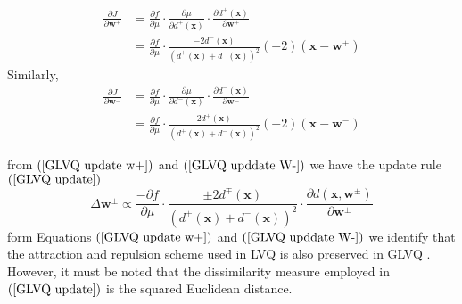 \documentclass[english]{HSMW-Thesis}
\begin{document}
\begin{equation}\label{GLVQ update w+}
	\begin{split}
		\frac{\partial J}{\partial \mathbf{w}^+}&=\frac{\partial f}{\partial \mu}\cdot\frac{\partial \mu}{\partial d^{+}\left( \mathbf{x}\right)}\cdot\frac{\partial d^{+}\left( \mathbf{x}\right) }{\partial \mathbf{w}^{+}}\\ 
		&= \frac{\partial f}{\partial \mu}\cdot\frac{-2d^{-}\left( \mathbf{x}\right) }{\left( d^{+}\left( \mathbf{x}\right) + d^{-}\left( \mathbf{x}\right) \right) ^2} \left( -2\right) \left( \mathbf{x}-\mathbf{w}^{+}\right) 	
	\end{split} 
\end{equation}
Similarly,
\begin{equation}\label{GLVQ upddate W-}
	\begin{split}
		\frac{\partial J}{\partial \mathbf{w}^-}&=\frac{\partial f}{\partial \mu}\cdot\frac{\partial \mu}{\partial d^{-}\left( \mathbf{x}\right)}\cdot\frac{\partial d^{-}\left( \mathbf{x}\right) }{\partial \mathbf{w}^{-}}\\
		&= \frac{\partial f}{\partial \mu}\cdot\frac{2d^{+}\left( \mathbf{x}\right) }{\left( d^{+}\left( \mathbf{x}\right) + d^{-}\left( \mathbf{x}\right) \right) ^2} \left( -2\right) \left( \mathbf{x}-\mathbf{w}^{-}\right)
	\end{split}
\end{equation}

from $\left( \ref{GLVQ update w+}\right)$  and $\left( \ref{GLVQ upddate W-}\right)$  we have the update rule $\left( \ref{GLVQ update}\right) $
\begin{equation}\label{GLVQ update}
	\Delta \mathbf{w}^{\pm}\propto\frac{-\partial f}{\partial \mu}\cdot\frac{\pm 2d^{\mp}\left( \mathbf{x}\right) }{\left( d^{+}\left( \mathbf{x}\right) +d^{-}\left( \mathbf{x}\right) \right)^2 }\cdot\frac{\partial d\left( \mathbf{x},\mathbf{w}^{\pm }\right) }{\partial \mathbf{w}^{\pm}}
\end{equation}
form Equations $\left( \ref{GLVQ update w+}\right)$  and $\left( \ref{GLVQ upddate W-}\right)$  we identify that the attraction and repulsion scheme used in LVQ  is also preserved  in GLVQ\cite{villmann2017can} .
However, it must be noted that the dissimilarity measure employed in $\left( \ref{GLVQ update}\right)$  is the squared Euclidean distance\cite{sato1996generalized}.
\end{document}
